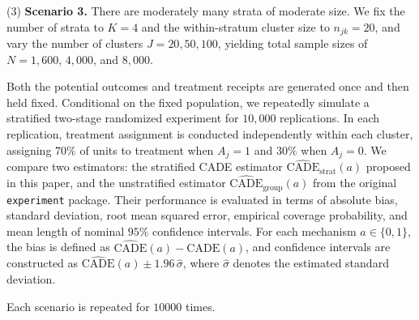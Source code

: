 \documentclass[a4paper, 12pt]{article}
\begin{document}
\medskip
\noindent (3) \textbf{Scenario 3.} There are moderately many strata of moderate size. We fix the number of strata to $K = 4$ and the within-stratum cluster size to $n_{jk} = 20$, and vary the number of clusters $J = 20, 50, 100$, yielding total sample sizes of $N = 1{,}600$, $4{,}000$, and $8{,}000$.

\medskip
Both the potential outcomes and treatment receipts are generated once and then held fixed. Conditional on the fixed population, we repeatedly simulate a stratified two-stage randomized experiment for $10{,}000$ replications. In each replication, treatment assignment is conducted independently within each cluster, assigning $70\%$ of units to treatment when $A_j = 1$ and $30\%$ when $A_j = 0$. We compare two estimators: the stratified CADE estimator $\widehat{\mathrm{CADE}}_{\mathrm{strat}}(a)$ proposed in this paper, and the unstratified estimator $\widehat{\mathrm{CADE}}_{\mathrm{group}}(a)$ from the original \texttt{experiment} package. Their performance is evaluated in terms of absolute bias, standard deviation, root mean squared error, empirical coverage probability, and mean length of nominal $95\%$ confidence intervals. For each mechanism $a \in \{0, 1\}$, the bias is defined as $\widehat{\mathrm{CADE}}(a) - \mathrm{CADE}(a)$, and confidence intervals are constructed as $\widehat{\mathrm{CADE}}(a) \pm 1.96\,\widehat{\sigma}$, where $\widehat{\sigma}$ denotes the estimated standard deviation.

Each scenario is repeated for $10000$ times.
 
\end{document}
